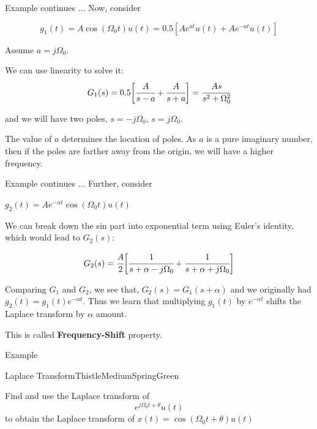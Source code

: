 \documentclass[aspectratio=169,xcolor=dvipsnames,svgnames,x11names,fleqn]{beamer}
\begin{document}
\begin{frame}{Example continues ...}
    Now, consider

    $$
    g_1(t)  = A\cos(\Omega_0 t) u(t) = 0.5[Ae^{at}u(t) + Ae^{-at}u(t)]
    $$

    Assume $ a= j \Omega_0$.

    We can use linearity to solve it:
$$
G_1(s) = 0.5\bigg[ \cfrac{A}{s-a} + \cfrac{A}{s+a} \bigg] = \cfrac{As}{s^2 + \Omega_0^2 }
$$

and we will have two poles, $s = -j \Omega_0$, $s = j \Omega_0$.

\begin{gradblue}
    The value of $a$ determines the location of poles. As $a$ is a pure imaginary number, then if the poles are farther away from the origin, we will have a higher frequency.
\end{gradblue} 
\end{frame}

\begin{frame}{Example continues ...}
Further, consider

$g_2(t) = Ae^{-\alpha t }\cos(\Omega_0t)u(t)$

We can break down the sin part into exponential term using Euler's identity, which would lead to $G_2(s)$:

$$
G_2(s) = \cfrac{A}{2}\bigg[ \cfrac{1}{s + \alpha - j\Omega_0}  + \cfrac{1}{s + \alpha + j\Omega_0}  \bigg] 
$$

\begin{gradyellow}
    Comparing $G_1$ and $G_2$, we see that, $G_2(s) = G_1(s + \alpha)$ and we originally had $g_2(t)  = g_1(t)e^{-\alpha t}$. Thus we learn that multiplying $g_1(t)$ by $e^{-\alpha t}$ shifts the Laplace transform by $\alpha$ amount.
\end{gradyellow}

This is called \textbf{Frequency-Shift} property.


\end{frame}

\begin{frame}{Example}
\vspace*{-4\baselineskip}
\begin{custombox}{Laplace Transform}{Thistle}{MediumSpringGreen}

        \large
        
    Find and use the Laplace transform of  
    $$
    e^{j\Omega_0 t + \theta} u(t)
 $$
 to obtain the Laplace transform of $x(t) = \cos(\Omega_0 t  + \theta ) u(t)$
    
\end{custombox}
\end{frame}
\end{document}
